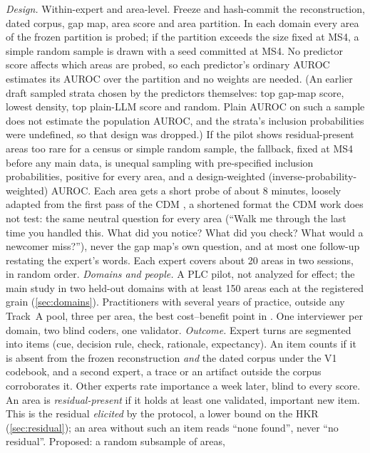\emph{Design.} Within-expert and area-level. Freeze and hash-commit the reconstruction, dated
corpus, gap map, area score and area partition. In each domain every area of the frozen partition is
probed; if the partition exceeds the size fixed at MS4, a simple random sample is drawn with a seed
committed at MS4. No predictor score affects which areas are probed, so each predictor's ordinary
AUROC estimates its AUROC over the partition and no weights are needed. (An earlier draft sampled
strata chosen by the predictors themselves: top gap-map score, lowest density, top plain-LLM score and
random. Plain AUROC on such a sample does not estimate the population AUROC, and the strata's inclusion
probabilities were undefined, so that design was dropped.) If the pilot shows residual-present areas
too rare for a census or simple random sample, the fallback, fixed at MS4 before any main data, is
unequal sampling with pre-specified inclusion probabilities, positive for every area, and a
design-weighted (inverse-probability-weighted) AUROC. Each area gets a short probe of about 8
minutes, loosely adapted from the first pass of the CDM \parencite{klein1989critical}, a shortened format
the CDM work does not test: the same neutral question for every area (\enquote{Walk me through the last time you handled this. What did
you notice? What did you check? What would a newcomer miss?}), never the gap map's own question,
and at most one follow-up restating the expert's words. Each expert covers about 20 areas in two
sessions, in random order.
\emph{Domains and people.} A PLC pilot, not analyzed for effect; the main study in two held-out
domains with at least 150 areas each at the registered grain (\cref{sec:domains}). Practitioners
with several years of practice, outside any Track~A pool, three per area, the best cost--benefit
point in \textcite{chao1994percentage}. One interviewer per domain, two blind coders, one
validator.
\emph{Outcome.} Expert turns are segmented into items (cue, decision rule, check, rationale,
expectancy). An item counts if it is absent from the frozen reconstruction \emph{and} the dated
corpus under the V1 codebook, and a second expert, a trace or an artifact outside the corpus
corroborates it. Other experts rate importance a week later, blind to every score. An area is
\emph{residual-present} if it holds at least one validated, important new item. This is the residual
\emph{elicited} by the protocol, a lower bound on the HKR (\cref{sec:residual}); an area without such
an item reads \enquote{none found}, never \enquote{no residual}. Proposed: a random subsample of areas,
